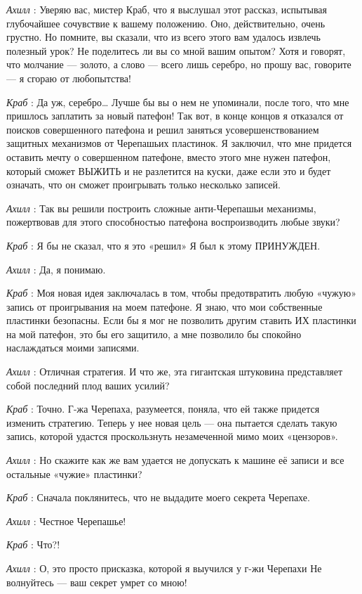 \documentclass[../main.tex]{subfiles}
\begin{document}
\begin{dialogue}
\emph{Ахилл} : Уверяю вас, мистер Краб, что я выслушал этот рассказ, испытывая глубочайшее сочувствие к вашему положению. Оно, действительно, очень грустно. Но помните, вы сказали, что из всего этого вам удалось извлечь полезный урок? Не поделитесь ли вы со мной вашим опытом? Хотя и говорят, что молчание --- золото, а слово --- всего лишь серебро, но прошу вас, говорите --- я сгораю от любопытства!

\emph{Краб} : Да уж, серебро\ldots{} Лучше бы вы о нем не упоминали, после того, что мне пришлось заплатить за новый патефон! Так вот, в конце концов я отказался от поисков совершенного патефона и решил заняться усовершенствованием защитных механизмов от Черепашьих пластинок. Я заключил, что мне придется оставить мечту о совершенном патефоне, вместо этого мне нужен патефон, который сможет ВЫЖИТЬ и не разлетится на куски, даже если это и будет означать, что он сможет проигрывать только несколько записей.

\emph{Ахилл} : Так вы решили построить сложные анти-Черепашьи механизмы, пожертвовав для этого способностью патефона воспроизводить любые звуки?

\emph{Краб} : Я бы не сказал, что я это «решил» Я был к этому ПРИНУЖДЕН.

\emph{Ахилл} : Да, я понимаю.

\emph{Краб} : Моя новая идея заключалась в том, чтобы предотвратить любую «чужую» запись от проигрывания на моем патефоне. Я знаю, что мои собственные пластинки безопасны. Если бы я мог не позволить другим ставить ИХ пластинки на мой патефон, это бы его защитило, а мне позволило бы спокойно наслаждаться моими записями.

\emph{Ахилл} : Отличная стратегия. И что же, эта гигантская штуковина представляет собой последний плод ваших усилий?

\emph{Краб} : Точно. Г-жа Черепаха, разумеется, поняла, что ей также придется изменить стратегию. Теперь у нее новая цель --- она пытается сделать такую запись, которой удастся проскользнуть незамеченной мимо моих «цензоров».

\emph{Ахилл} : Но скажите как же вам удается не допускать к машине её записи и все остальные «чужие» пластинки?

\emph{Краб} : Сначала поклянитесь, что не выдадите моего секрета Черепахе.

\emph{Ахилл} : Честное Черепашье!

\emph{Краб} : Что?!

\emph{Ахилл} : О, это просто присказка, которой я выучился у г-жи Черепахи Не волнуйтесь --- ваш секрет умрет со мною!


\end{dialogue}
\end{document}
